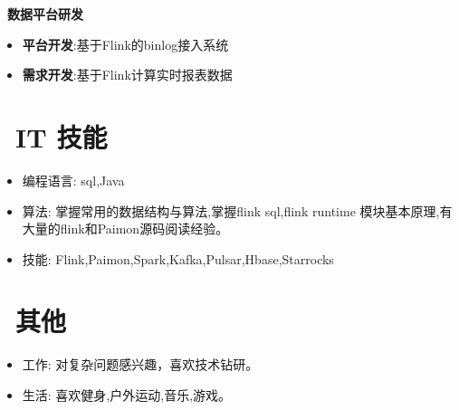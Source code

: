 \documentclass{resume}
\begin{document}
\
\textbf{数据平台研发}
\begin{itemize}
  \item \textbf{平台开发}:基于Flink的binlog接入系统
  \item \textbf{需求开发}:基于Flink计算实时报表数据
\end{itemize}

\section{\faCogs\ IT 技能}
\begin{itemize}[parsep=0.5ex]
  \item 编程语言: sql,Java
  \item 算法: 掌握常用的数据结构与算法,掌握flink sql,flink runtime 模块基本原理,有大量的flink和Paimon源码阅读经验。
  \item 技能: Flink,Paimon,Spark,Kafka,Pulsar,Hbase,Starrocks
\end{itemize}

\section{\faInfo\ 其他}
\begin{itemize}[parsep=0.5ex]
  \item 工作: 对复杂问题感兴趣，喜欢技术钻研。
  \item 生活: 喜欢健身,户外运动,音乐,游戏。
\end{itemize}

%
%
\end{document}
